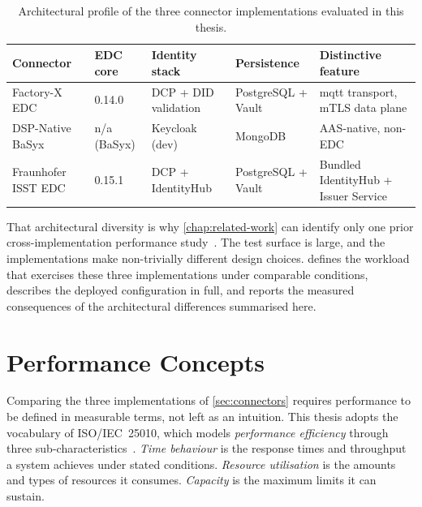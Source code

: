 \pagebreak

\begin{table}[ht]
    \centering
    \small
    \setlength{\tabcolsep}{4pt}
    \begin{tabularx}{\textwidth}{@{}l l X X X@{}}
        \toprule
        \textbf{Connector} & \textbf{EDC core} & \textbf{Identity stack} & \textbf{Persistence} & \textbf{Distinctive feature} \\
        \midrule
        Factory-X EDC       & 0.14.0      & DCP + DID validation & PostgreSQL + Vault & \gls{mqtt} transport, mTLS data plane      \\
        DSP-Native BaSyx    & n/a (BaSyx) & Keycloak (dev)       & MongoDB            & AAS-native, non-EDC                  \\
        Fraunhofer ISST EDC & 0.15.1      & DCP + IdentityHub    & PostgreSQL + Vault & Bundled IdentityHub + Issuer Service \\
        \bottomrule
    \end{tabularx}
    \caption[Architectural profile of the three connector implementations]{Architectural profile of the three connector implementations evaluated in this thesis.}
    \label{tab:connector-comparison}
\end{table}

That architectural diversity is why \cref{chap:related-work} can identify only one prior cross-implementation performance study~\citep{evaluatingtheperformanceimpactofdatasovereignty}. The test surface is large, and the implementations make non-trivially different design choices.  defines the workload that exercises these three implementations under comparable conditions,  describes the deployed configuration in full, and  reports the measured consequences of the architectural differences summarised here.


\section{Performance Concepts}\label{sec:performance-concepts}

Comparing the three implementations of \cref{sec:connectors} requires performance to be defined in measurable terms, not left as an intuition. This thesis adopts the vocabulary of ISO/IEC~25010, which models \emph{performance efficiency} through three sub-characteristics~\citep{iso25010}. \emph{Time behaviour} is the response times and throughput a system achieves under stated conditions. \emph{Resource utilisation} is the amounts and types of resources it consumes. \emph{Capacity} is the maximum limits it can sustain.

